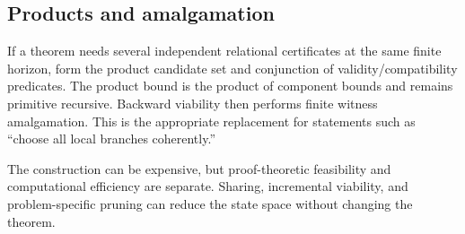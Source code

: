 \subsection{Products and amalgamation}

If a theorem needs several independent relational certificates at the same finite horizon, form the product candidate set and conjunction of validity/compatibility predicates.  The product bound is the product of component bounds and remains primitive recursive.  Backward viability then performs finite witness amalgamation.  This is the appropriate replacement for statements such as ``choose all local branches coherently.''

The construction can be expensive, but proof-theoretic feasibility and computational efficiency are separate.  Sharing, incremental viability, and problem-specific pruning can reduce the state space without changing the theorem.

